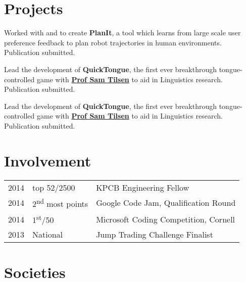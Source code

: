 \documentclass[]{deedy-resume-openfont}
\begin{document}
\begin{minipage}[t]{0.66\textwidth}

\section{Projects}
Worked with and to create \textbf{PlanIt}, a tool which  learns from large scale user preference feedback to plan robot trajectories in human environments.  Publication submitted.
\sectionsep

Lead the development of \textbf{QuickTongue}, the first ever breakthrough tongue-controlled game with \textbf{\href{http://conf.ling.cornell.edu/~tilsen/}{Prof Sam Tilsen}} to aid in Linguistics research. Publication submitted.
\sectionsep

Lead the development of \textbf{QuickTongue}, the first ever breakthrough tongue-controlled game with \textbf{\href{http://conf.ling.cornell.edu/~tilsen/}{Prof Sam Tilsen}} to aid in Linguistics research. Publication submitted.
\sectionsep


\section{Involvement} 
\begin{tabular}{rll}
2014	     & top 52/2500  & KPCB Engineering Fellow\\
2014	     & 2\textsuperscript{nd} most points  & Google Code Jam, Qualification Round\\
2014	     & 1\textsuperscript{st}/50  & Microsoft Coding Competition, Cornell\\
2013	     & National  & Jump Trading Challenge Finalist\\


\end{tabular}
\sectionsep


\section{Societies} 


\end{minipage}
\end{document}
